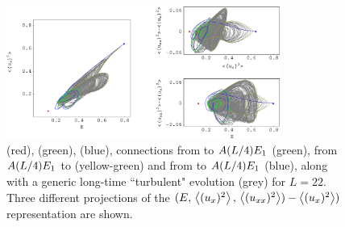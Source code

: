 \begin{figure}[t] 
\begin{center}
    \includegraphics[width=0.8\textwidth]{figs/ks22TurbConn_xfig.eps}
\end{center}
\caption{
 (red),  (green),  (blue), 
connections from  to $A(L/4)E_{1}$ (green),
from $A(L/4)E_{1}$ to  (yellow-green) 
and from  to $A(L/4)E_{1}$ (blue), along
with a generic long-time ``turbulent" evolution (grey) for $L=22$. 
Three different projections of the 
$(E,\, \left\langle {(u_{x})^2} \right\rangle,\, \left\langle {(u_{xx})^2} \right\rangle)-\left\langle {(u_{x})^2} \right\rangle)$
representation are shown.
        }
\label{f:drivedragConn}
\end{figure}


